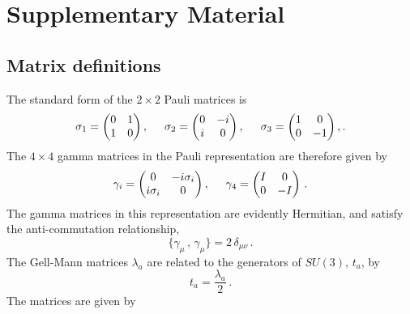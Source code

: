 \chapter{Supplementary Material}
\section{Matrix definitions}\label{app:GellMann}
The standard form of the $2\times 2$ Pauli matrices is
%
\begin{equation*}
\sigma_1 = \begin{pmatrix}
0 & 1\\
1 & 0
\end{pmatrix},
\hspace{0.5cm}
\sigma_2 = \begin{pmatrix}
0 & -i\\
i & 0
\end{pmatrix},
\hspace{0.5cm}
\sigma_3 = \begin{pmatrix}
1 & 0\\
0 & -1
\end{pmatrix}\\, .
\end{equation*}
%
The $4\times 4$ gamma matrices in the Pauli representation are therefore given by
%
\begin{align*}
\gamma_i = \begin{pmatrix}
0 & -i\sigma_i\\
i\sigma_i & 0
\end{pmatrix},
\hspace{0.5cm}
\gamma_4 = \begin{pmatrix}
I & 0\\
0 & -I
\end{pmatrix}\, .
\end{align*} 
%
The gamma matrices in this representation are evidently Hermitian, and satisfy the anti-commutation relationship,
%
\begin{equation*}
\lbrace \gamma_\mu\, ,\, \gamma_\mu \rbrace = 2\,\delta_{\mu\nu}\, .
\end{equation*}
%
The Gell-Mann matrices $\lambda_a$ are related to the generators of $SU(3)$, $t_a$, by
%
\begin{equation}
t_a = \frac{\lambda_a}{2}\, .
\end{equation}
%
The matrices are given by
%
